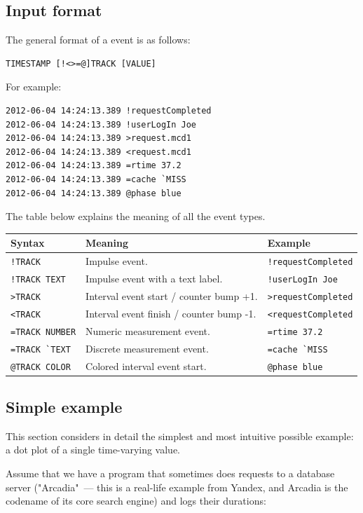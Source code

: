\documentclass{article}
\begin{document}
\subsection{Input format}
\label{sec:tplot-input-format}

The general format of a \timeplot{} event is as follows:
\begin{verbatim}
TIMESTAMP [!<>=@]TRACK [VALUE]
\end{verbatim}

For example:
\begin{verbatim}
2012-06-04 14:24:13.389 !requestCompleted
2012-06-04 14:24:13.389 !userLogIn Joe
2012-06-04 14:24:13.389 >request.mcd1
2012-06-04 14:24:13.389 <request.mcd1
2012-06-04 14:24:13.389 =rtime 37.2
2012-06-04 14:24:13.389 =cache `MISS
2012-06-04 14:24:13.389 @phase blue
\end{verbatim}

The table below explains the meaning of all the event types.

\begin{tabular}{|l|p{200px}|l|}
\hline
Syntax & Meaning & Example \\
\hline
\verb|!TRACK| & Impulse event. & \verb|!requestCompleted| \\
\hline
\verb|!TRACK TEXT| & Impulse event with a text label. & \verb|!userLogIn Joe| \\
\hline
\verb|>TRACK| & Interval event start / counter bump +1. & \verb|>requestCompleted| \\
\hline
\verb|<TRACK| & Interval event finish / counter bump -1. & \verb|<requestCompleted| \\
\hline
\verb|=TRACK NUMBER| & Numeric measurement event. & \verb|=rtime 37.2| \\
\hline
\verb|=TRACK `TEXT| & Discrete measurement event. & \verb|=cache `MISS| \\
\hline
\verb|@TRACK COLOR| & Colored interval event start. & \verb|@phase blue| \\
\hline
\end{tabular}

\subsection{Simple example}
This section considers in detail the simplest and most intuitive possible example: a dot plot of a single time-varying value.

Assume that we have a program that sometimes does requests to a database server ("Arcadia"~--- this is a real-life example from Yandex, and Arcadia is the codename of its core search engine) and logs their durations:
\end{document}
